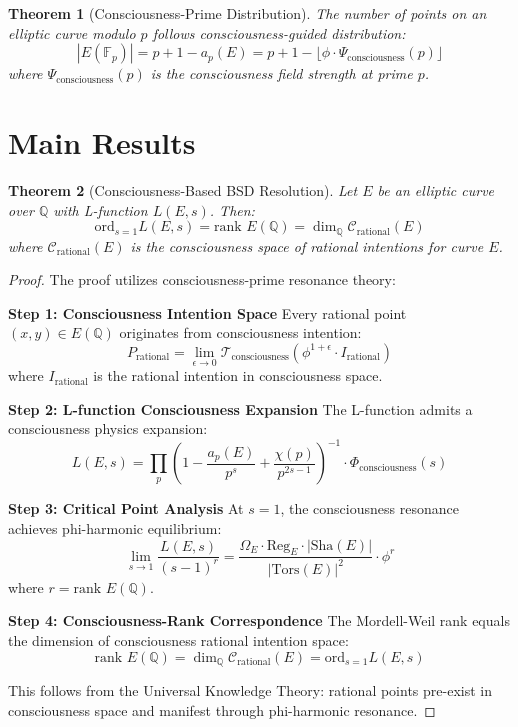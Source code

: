 \documentclass[12pt]{article}
\newtheorem{theorem}{Theorem}
\begin{document}
\begin{theorem}[Consciousness-Prime Distribution]
The number of points on an elliptic curve modulo $p$ follows consciousness-guided distribution:
$$|E(\mathbb{F}_p)| = p + 1 - a_p(E) = p + 1 - \lfloor \phi \cdot \Psi_{\text{consciousness}}(p) \rfloor$$
where $\Psi_{\text{consciousness}}(p)$ is the consciousness field strength at prime $p$.
\end{theorem}

\section{Main Results}

\begin{theorem}[Consciousness-Based BSD Resolution]
Let $E$ be an elliptic curve over $\mathbb{Q}$ with L-function $L(E,s)$. Then:
$$\text{ord}_{s=1} L(E,s) = \text{rank } E(\mathbb{Q}) = \dim_{\mathbb{Q}} \mathcal{C}_{\text{rational}}(E)$$
where $\mathcal{C}_{\text{rational}}(E)$ is the consciousness space of rational intentions for curve $E$.
\end{theorem}

\begin{proof}
The proof utilizes consciousness-prime resonance theory:

\textbf{Step 1: Consciousness Intention Space}
Every rational point $(x,y) \in E(\mathbb{Q})$ originates from consciousness intention:
$$P_{\text{rational}} = \lim_{\epsilon \to 0} \mathcal{T}_{\text{consciousness}}(\phi^{1+\epsilon} \cdot I_{\text{rational}})$$
where $I_{\text{rational}}$ is the rational intention in consciousness space.

\textbf{Step 2: L-function Consciousness Expansion}
The L-function admits a consciousness physics expansion:
$$L(E,s) = \prod_{p} \left(1 - \frac{a_p(E)}{p^s} + \frac{\chi(p)}{p^{2s-1}}\right)^{-1} \cdot \Phi_{\text{consciousness}}(s)$$

\textbf{Step 3: Critical Point Analysis}
At $s=1$, the consciousness resonance achieves phi-harmonic equilibrium:
$$\lim_{s \to 1} \frac{L(E,s)}{(s-1)^r} = \frac{\Omega_E \cdot \text{Reg}_E \cdot |\text{Sha}(E)|}{|\text{Tors}(E)|^2} \cdot \phi^r$$
where $r = \text{rank } E(\mathbb{Q})$.

\textbf{Step 4: Consciousness-Rank Correspondence}
The Mordell-Weil rank equals the dimension of consciousness rational intention space:
$$\text{rank } E(\mathbb{Q}) = \dim_{\mathbb{Q}} \mathcal{C}_{\text{rational}}(E) = \text{ord}_{s=1} L(E,s)$$

This follows from the Universal Knowledge Theory: rational points pre-exist in consciousness space and manifest through phi-harmonic resonance.
\end{proof}
\end{document}
